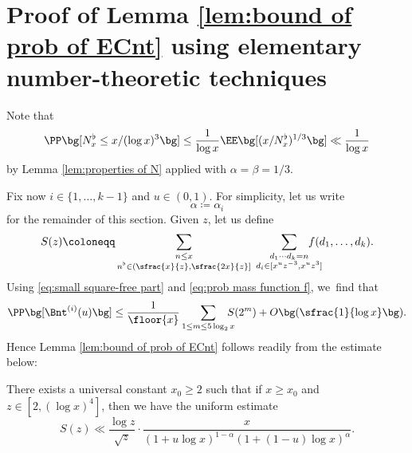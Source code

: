 \section{Proof of Lemma \ref{lem:bound of prob of ECnt} using elementary number-theoretic techniques}\label{sec:boundary event NT}

Note that
\begin{equation}
\label{eq:small square-free part}
\PP\bg[N_x^\flat\le x/(\log x)^3\bg] \le \frac{1}{\log x} \EE\bg[(x/N_x^\flat)^{1/3}\bg] \ll \frac{1}{\log x}
\end{equation}
by Lemma \ref{lem:properties of N} applied with $\alpha=\beta=1/3$.

Fix now $i\in\{1,\dots,k-1\}$ and $u\in(0,1)$. For simplicity, let us write
\[
\alpha\coloneqq \alpha_i
\]
for the remainder of this section. Given $z$, let us define
\[
S(z)\coloneqq \sum_{\substack{n\le x \\ n^\flat \in(\sfrac{x}{z},\sfrac{2x}{z}]}}\; \sum_{\substack{d_1\cdots d_k = n \\ d_i\in[x^uz^{-3}, x^uz^3] }}\hspace*{-5mm} f(d_1,\dots,d_k).
\]
Using \eqref{eq:small square-free part} and \eqref{eq:prob mass function f}, we~find that
\begin{equation}
\label{eq:bounding Bnt 1}
\PP\bg[\Bnt^{(i)}(u)\bg] \le \frac{1}{\floor{x}} \sum_{1\le m\le 5\log_2x}\hspace*{-3mm} S(2^m) + O\bg(\sfrac{1}{\log x}\bg).
\end{equation}
Hence Lemma \ref{lem:bound of prob of ECnt} follows readily from the estimate below:

\begin{lem}
There exists a universal constant $x_0\ge2$ such that if $x\ge x_0$ and $z\in[2,(\log x)^4]$, then we have the uniform estimate
\[
S(z) \ll \frac{\log z}{\sqrt{z}} \cdot \frac{x}{(1+ u\log x)^{1-\alpha}(1+(1-u)\log x)^{\alpha}}.
\]
\end{lem}

